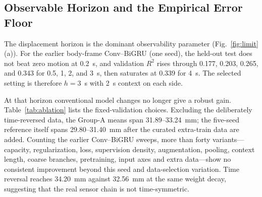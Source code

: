 \subsection{Observable Horizon and the Empirical Error Floor}
\label{sec:limit}
The displacement horizon is the dominant observability parameter
(Fig.~\ref{fig:limit}(a)). For the earlier body-frame Conv--BiGRU (one seed),
the held-out test does not beat zero motion at 0.2~s, and validation $R^2$ rises through 0.177, 0.203, 0.265, and 0.343 for 0.5, 1, 2,
and 3~s, then saturates at 0.339 for 4~s. The selected setting is therefore
$h=3$~s with 2~s context on each side.

At that horizon conventional model changes no longer give a robust gain.
Table~\ref{tab:ablation} lists the fixed-validation choices. Excluding the
deliberately time-reversed data, the Group-A means span 31.89--33.24~mm;
the five-seed reference itself spans 29.80--31.40~mm after the curated
extra-train data are added. Counting the earlier Conv--BiGRU sweeps, more than
forty variants---capacity, regularization, loss, supervision density,
augmentation, pooling, context length, coarse branches, pretraining, input
axes and extra data---show no consistent improvement beyond this seed and
data-selection variation. Time reversal reaches 34.20~mm against 32.56~mm at
the same weight decay, suggesting that the real sensor chain is not
time-symmetric.

